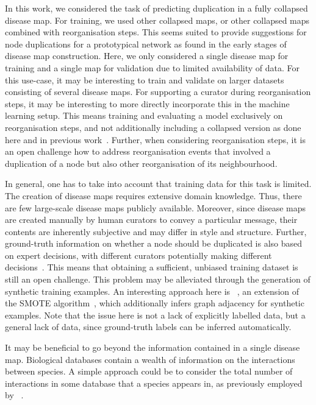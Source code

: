 \documentclass[
	fontsize=10pt, %
	twoside=true, %
	secnumdepth=1, %
  toc=indentunnumbered %
]{kaobook}
\begin{document}
In this work, we considered the task of predicting duplication in a fully
collapsed disease map. For training, we used other collapsed maps, or other
collapsed maps combined with reorganisation steps. This seems suited to provide
suggestions for node duplications for a prototypical network as found in the early
stages of disease map construction. Here, we only considered a single disease
map for training and a single map for validation due to limited availability of
data. For this use-case, it may be interesting to train and validate on larger
datasets consisting of several disease maps.
%
For supporting a curator during reorganisation steps, it may be interesting to
more directly incorporate this in the machine learning setup. This means
training and evaluating a model exclusively on reorganisation steps, and not
additionally including a collapsed version as done here and in previous
work~\cite{nielsen_MachineLearningSupport_2019}.
%
Further, when considering reorganisation steps, it is an open challenge how to address
reorganisation events that involved a duplication of a node but also other
reorganisation of its neighbourhood.

In general, one has to take into account that training data for this task is
limited. The creation of disease maps requires extensive domain
knowledge. Thus, there are few large-scale disease maps publicly available.
Moreover, since disease maps are created manually by human curators to convey a
particular message, their contents are inherently subjective and may differ in
style and structure. Further, ground-truth information on whether a node should
be duplicated is also based on expert decisions, with different curators
potentially making different
decisions~\cite{nielsen_MachineLearningSupport_2019}. This means that obtaining
a sufficient, unbiased training dataset is still an open challenge.
This problem may be alleviated through the
generation of synthetic training examples. An interesting approach here is
~\cite{zhao_GraphSMOTEImbalancedNode_2021}, an extension of the
\textsc{SMOTE} algorithm~\cite{chawla_SMOTESyntheticMinority_2002}, which
additionally infers graph adjacency for synthetic examples. Note that the issue
here is not a lack of explicitly labelled data, but a general lack of data,
since ground-truth labels can be inferred automatically.

It may be beneficial to go beyond the information contained in a single disease
map. Biological databases contain a wealth of information on the interactions
between species. A simple approach could be to consider the total number of
interactions in some database that a species appears in, as previously employed
by
\citeauthor{direks_DynamicVisualizationMetabolic_2014}~\cite{direks_DynamicVisualizationMetabolic_2014}.
\end{document}
